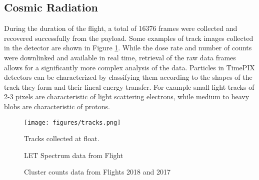 \subsection{Cosmic Radiation}
\label{sec:Cosmic-Radiation-Results}

During the duration of the flight, a total of 16376 frames were collected and recovered successfully from the payload. Some examples of track images collected in the detector are shown in Figure \ref{tracks}. While the dose rate and number of counts were downlinked and available in real time, retrieval of the raw data frames allows for a significantly more complex analysis of the data. Particles in TimePIX detectors can be characterized by classifying them according to the shapes of the track they form and their lineal energy transfer. For example small light tracks of 2-3 pixels are characteristic of light scattering electrons, while medium to heavy blobs are characteristic of protons.

\begin{figure}[H]
	\begin{center}
	\texttt{[image: figures/tracks.png]}
	\caption{Tracks collected at float.}
	\label{tracks}
	\end{center}
\end{figure}

\begin{figure}[H]
\hfill
{}
\hfill
{}
\hfill
\caption{LET Spectrum data from Flight}
\end{figure}

\begin{figure}[H]
\hfill
{}
\hfill
{}
\hfill
\caption{Cluster counts data from Flights 2018 and 2017}
\end{figure}


